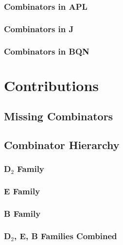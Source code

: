 \documentclass[10pt]{article}
\begin{document}
\subsubsection{Combinators in APL}

\subsubsection{Combinators in J}

\subsubsection{Combinators in BQN}

\section{Contributions}

\subsection{Missing Combinators}

\subsection{Combinator Hierarchy}

\subsubsection{D$_2$ Family}

\subsubsection{E Family}

\subsubsection{B Family}

\subsubsection{D$_2$, E, B Families Combined}
\end{document}
